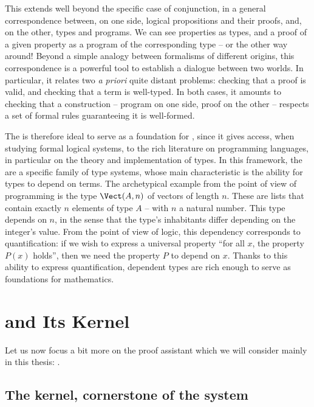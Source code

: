 This extends well beyond the specific case of conjunction, in a general correspondence
between, on one side, logical propositions and their proofs, and, on the other, types and programs.
We can see properties as types, and a proof of a given property as a program of the
corresponding type – or the other way around!
Beyond a simple analogy between formalisms of different origins, this correspondence
is a powerful tool to establish a dialogue between two worlds. In particular, it
relates two \textit{a priori} quite distant problems: checking that a proof
is valid, and checking that a term is well-typed. In both cases, it amounts to checking that
a construction – program on one side, proof on the other – respects a set of formal
rules guaranteeing it is well-formed.

The  is therefore ideal to serve as a foundation for
, since it gives access, when studying formal logical systems,
to the rich literature on programming languages, in particular on the theory and
implementation of types. In this framework, the
 are a specific family of type systems,
whose main characteristic is the ability for types to depend on terms. The archetypical
example from the point of view of programming is the type $\Vect(A,n)$
of vectors of length $n$. These are lists that contain exactly $n$ elements of type $A$ – with
$n$ a natural number.
This type depends on $n$, in the sense that the type’s inhabitants differ depending on the
integer’s value.
From the point of view of logic, this dependency corresponds to quantification: if we
wish to express a universal property “for all $x$, the property $P(x)$ holds”, then we need
the property $P$ to depend on $x$.
Thanks to this ability to express quantification, dependent types are rich enough
to serve as foundations for mathematics.

\section{ and Its Kernel}
\label{sec:intro-coq-en}

Let us now focus a bit more on the proof assistant which we will consider mainly in this
thesis: .

\subsection[The kernel]{The kernel, cornerstone of the system}

